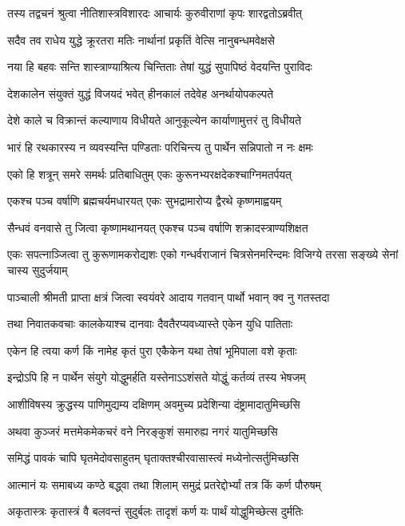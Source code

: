 \twolineshloka
{तस्य तद्वचनं श्रुत्वा नीतिशास्त्रविशारदः}
{आचार्यः कुरुवीराणां कृपः शारद्वतोऽब्रवीत्}


\twolineshloka
{सदैव तव राधेय युद्धे क्रूरतरा मतिः}
{नार्थानां प्रकृतिं वेत्सि नानुबन्धमवेक्षसे}


\twolineshloka
{नया हि बहवः सन्ति शास्त्राण्याश्रित्य चिन्तिताः}
{तेषां युद्धं सुपापिष्ठं वेदयन्ति पुराविदः}


\twolineshloka
{देशकालेन संयुक्तं युद्धं विजयदं भवेत्}
{हीनकालं तदेवेह अनर्थायोपकल्पते}


\twolineshloka
{देशे काले च विक्रान्तं कल्याणाय विधीयते}
{आनुकूल्येन कार्याणामुत्तरं तु विधीयते}


\twolineshloka
{भारं हि रथकारस्य न व्यवस्यन्ति पण्डिताः}
{परिचिन्त्य तु पार्थेन सन्निपातो न नः क्षमः}


\twolineshloka
{एको हि शत्रून् समरे समर्थः प्रतिबाधितुम्}
{एकः कुरूनभ्यरक्षदेकश्चाग्निमतर्पयत्}


\twolineshloka
{एकश्च पञ्च वर्षाणि ब्रह्मचर्यमधारयत्}
{एकः सुभद्रामारोप्य द्वैरथे कृष्णमाह्वयम्}


\twolineshloka
{सैन्धवं वनवासे तु जित्वा कृष्णामथानयत्}
{एकश्च पञ्च वर्षाणि शक्रादस्त्राण्यशिक्षत}


\threelineshloka
{एकः सपत्नाञ्जित्वा तु कुरूणामकरोद्यशः}
{एको गन्धर्वराजानं चित्रसेनमरिन्दमः}
{विजिग्ये तरसा सङ्ख्ये सेनां चास्य सुदुर्जयाम्}


\twolineshloka
{पाञ्चाली श्रीमती प्राप्ता क्षत्रं जित्वा स्वयंवरे}
{आदाय गतवान् पार्थो भवान् क्व नु गतस्तदा}


\twolineshloka
{तथा निवातकवचाः कालकेयाश्च दानवाः}
{दैवतैरप्यवध्यास्ते एकेन युधि पातिताः}


\twolineshloka
{एकेन हि त्वया कर्ण किं नामेह कृतं पुरा}
{एकैकेन यथा तेषां भूमिपाला वशे कृताः}


\twolineshloka
{इन्द्रोऽपि हि न पार्थेन संयुगे योद्धुमर्हति}
{यस्तेनाऽऽशंसते योद्धुं कर्तव्यं तस्य भेषजम्}


\twolineshloka
{आशीविषस्य क्रुद्धस्य पाणिमुद्यम्य दक्षिणम्}
{अवमुच्य प्रदेशिन्या दंष्ट्रामादातुमिच्छसि}


\twolineshloka
{अथवा कुञ्जरं मत्तमेकमेकचरं वने}
{निरङ्कुशं समारुह्य नगरं यातुमिच्छसि}


\twolineshloka
{समिद्धं पावकं चापि घृतमेदोवसाहुतम्}
{घृताक्तश्चीरवासास्त्वं मध्येनोत्सर्तुमिच्छसि}


\twolineshloka
{आत्मानं यः समाबध्य कण्ठे बद्ध्वा तथा शिलाम्}
{समुद्रं प्रतरेद्दोर्भ्यां तत्र किं कर्ण पौरुषम्}


\twolineshloka
{अकृतास्त्रः कृतास्त्रं वै बलवन्तं सुदुर्बलः}
{तादृशं कर्ण यः पार्थं योद्धुमिच्छेत्स दुर्मतिः}


